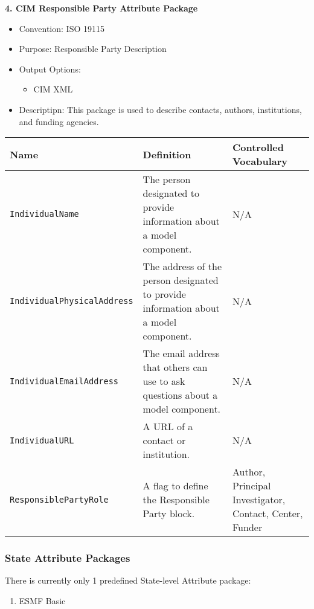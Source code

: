 \vspace{.20in}

{\bf 4. CIM Responsible Party Attribute Package}

\begin{itemize}
    \item Convention: ISO 19115
    \item Purpose: Responsible Party Description
    \item Output Options: 
    \begin{itemize}
        \item CIM XML 
    \end{itemize} 
    \item Descriptipn: This package is used to describe contacts, authors, institutions, and funding agencies. 
\end{itemize}


\begin{tabular}{|p{8cm}|p{20cm}|p{10cm}|}
     {\bf Name } & {\bf Definition} & {\bf Controlled Vocabulary} \\
     \hline\hline
     {\tt IndividualName} & The person designated to provide information about a model component. & N/A \\
     {\tt IndividualPhysicalAddress} & The address of the person designated to provide information about a model component. & N/A \\
     {\tt IndividualEmailAddress} & The email address that others can use to ask questions about a model component. & N/A \\
     {\tt IndividualURL} & A URL of a contact or institution. & N/A \\
     {\tt ResponsiblePartyRole} & A flag to define the Responsible Party block. & Author, Principal Investigator, Contact, Center, Funder\\
\end{tabular}



\vspace{.20in}
\subsubsection{State Attribute Packages}
\label{StateAttributePackages}

There is currently only 1 predefined State-level Attribute package:

\begin{enumerate}
    \item ESMF Basic
\end{enumerate}



